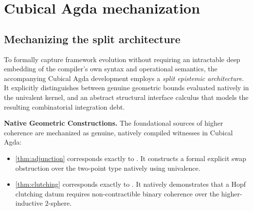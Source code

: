 \documentclass{lmcs}
\begin{document}
\section{Cubical Agda mechanization}
\label{sec:mechanization}

\subsection{Mechanizing the split architecture}

To formally capture framework evolution without requiring an intractable deep embedding of the compiler's own syntax and operational semantics, the accompanying Cubical Agda development employs a \emph{split epistemic architecture}. It explicitly distinguishes between genuine geometric bounds evaluated natively in the univalent kernel, and an abstract structural interface calculus that models the resulting combinatorial integration debt.

\textbf{Native Geometric Constructions.}
The foundational sources of higher coherence are mechanized as genuine, natively compiled witnesses in Cubical Agda:
\begin{itemize}
    \item \autoref{thm:adjunction} corresponds exactly to . It constructs a formal explicit swap obstruction over the two-point type natively using univalence.
    \item \autoref{thm:clutching} corresponds exactly to . It natively demonstrates that a Hopf clutching datum requires non-contractible binary coherence over the higher-inductive $2$-sphere.
\end{itemize}
\end{document}
